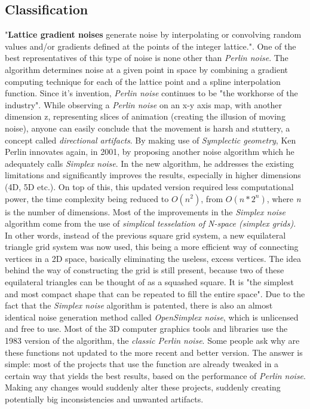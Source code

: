 \subsection{Classification}

"\textbf{Lattice gradient noises} generate noise by interpolating or
convolving random values and/or gradients defined at the
points of the integer lattice.". One of the best representatives of this type of noise is none other than \textit{Perlin noise}. The algorithm determines noise at a given point in space by combining a gradient computing technique for each of the lattice point and a spline interpolation function. Since it's invention, \textit{Perlin noise} continues to be "the workhorse of the industry"\cite{lagae2010survey}. While observing a \textit{Perlin noise} on an x-y axis map, with another dimension z, representing slices of animation (creating the illusion of moving noise), anyone can easily conclude that the movement is harsh and stuttery, a concept called \textit{directional artifacts}. By making use of \textit{Symplectic geometry}, Ken Perlin innovates again, in 2001, by proposing another noise algorithm which he adequately calls \textit{Simplex noise}. In the new algorithm, he addresses the existing limitations and significantly improves the results, especially in higher dimensions (4D, 5D etc.). On top of this, this updated version required less computational power, the time complexity being reduced to \(O(n^2)\), from \(O(n*2^n)\), where \textit{n} is the number of dimensions. Most of the improvements in the \textit{Simplex noise} algorithm come from the use of \textit{simplical tesselation of N-space (simplex grids)}. In other words, instead of the previous square grid system, a new equilateral triangle grid system was now used, this being a more efficient way of connecting vertices in a 2D space, basically eliminating the useless, excess vertices. The idea behind the way of constructing the grid is still present, because two of these equilateral triangles can be thought of as a squashed square. It is "the simplest and most compact shape that can be repeated to fill the entire space"\cite{gustavson2005simplex}. Due to the fact that the \textit{Simplex noise} algorithm is patented, there is also an almost identical noise generation method called \textit{OpenSimplex noise}, which is unlicensed and free to use. Most of the 3D computer graphics tools and libraries use the 1983 version of the algorithm, the \textit{classic Perlin noise}. Some people ask why are these functions not updated to the more recent and better version. The answer is simple: most of the projects that use the function are already tweaked in a certain way that yields the best results, based on the performance of \textit{Perlin noise}. Making any changes would suddenly alter these projects, suddenly creating potentially big inconsistencies and unwanted artifacts.\\

